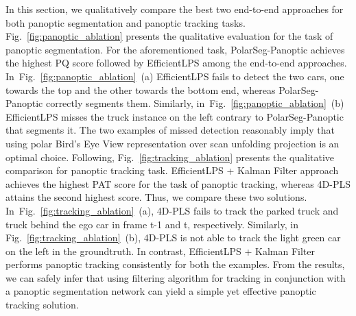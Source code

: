 \documentclass[letterpaper, 10 pt, journal, twoside]{IEEEtran}
\newcommand{\figref}[1]{Fig.~\ref{#1}}
\begin{document}
In this section, we qualitatively compare the best two end-to-end approaches for both panoptic segmentation and panoptic tracking tasks. \figref{fig:panoptic_ablation} presents the qualitative evaluation for the task of panoptic segmentation. For the aforementioned task, PolarSeg-Panoptic achieves the highest PQ score followed by EfficientLPS among the end-to-end approaches. In~\figref{fig:panoptic_ablation}~(a) EfficientLPS fails to detect the two cars, one towards the top and the other towards the bottom end, whereas PolarSeg-Panoptic correctly segments them. Similarly, in~\figref{fig:panoptic_ablation}~(b) EfficientLPS misses the truck instance on the left contrary to PolarSeg-Panoptic that segments it. The two examples of missed detection reasonably imply that using polar Bird's Eye View representation over scan unfolding projection is an optimal choice. Following, \figref{fig:tracking_ablation} presents the qualitative comparison for panoptic tracking task. EfficientLPS + Kalman Filter approach achieves the highest PAT score for the task of panoptic tracking, whereas 4D-PLS attains the second highest score. Thus, we compare these two solutions. In~\figref{fig:tracking_ablation}~(a), 4D-PLS fails to track the parked truck and truck behind the ego car in frame t-1 and t, respectively. Similarly, in \figref{fig:tracking_ablation}~(b), 4D-PLS is not able to track the light green car on the left in the groundtruth. In contrast, EfficientLPS + Kalman Filter performs panoptic tracking consistently for both the examples. From the results, we can safely infer that using filtering algorithm for tracking in conjunction with a panoptic segmentation network can yield a simple yet effective panoptic tracking solution.











%
 
\end{document}
